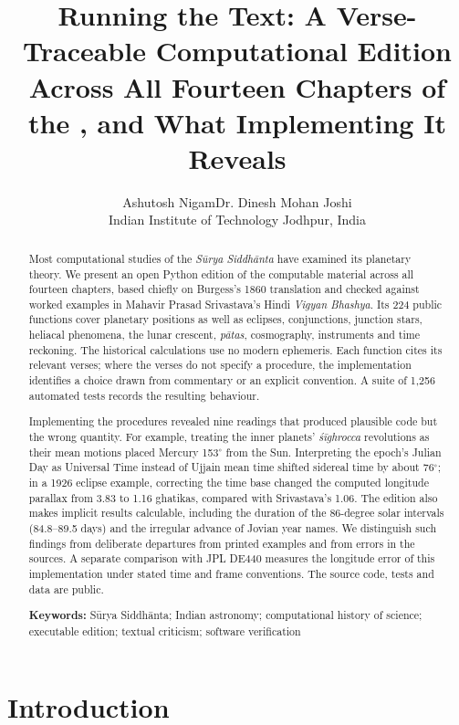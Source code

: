 \documentclass[11pt,a4paper]{article}
\title{Running the Text: A Verse-Traceable Computational Edition Across All Fourteen Chapters of the \SuSi{}, and What Implementing It Reveals}
\author{Ashutosh Nigam\quad Dr. Dinesh Mohan Joshi\\[6pt]
\small Indian Institute of Technology Jodhpur, India}
\date{}
\begin{document}
\maketitle

\begin{abstract}
Most computational studies of the \textit{S\={u}rya Siddh\={a}nta} have examined its planetary theory. We present an open Python edition of the computable material across all fourteen chapters, based chiefly on Burgess's 1860 translation and checked against worked examples in Mahavir Prasad Srivastava's Hindi \textit{Vigyan Bhashya}. Its 224 public functions cover planetary positions as well as eclipses, conjunctions, junction stars, heliacal phenomena, the lunar crescent, \textit{p\={a}tas}, cosmography, instruments and time reckoning. The historical calculations use no modern ephemeris. Each function cites its relevant verses; where the verses do not specify a procedure, the implementation identifies a choice drawn from commentary or an explicit convention. A suite of 1,256 automated tests records the resulting behaviour.

Implementing the procedures revealed nine readings that produced plausible code but the wrong quantity. For example, treating the inner planets' \textit{\'{s}\={i}ghrocca} revolutions as their mean motions placed Mercury 153$^\circ$ from the Sun. Interpreting the epoch's Julian Day as Universal Time instead of Ujjain mean time shifted sidereal time by about 76$^\circ$; in a 1926 eclipse example, correcting the time base changed the computed longitude parallax from 3.83 to 1.16 ghatikas, compared with Srivastava's 1.06. The edition also makes implicit results calculable, including the duration of the 86-degree solar intervals (84.8--89.5 days) and the irregular advance of Jovian year names. We distinguish such findings from deliberate departures from printed examples and from errors in the sources. A separate comparison with JPL DE440 measures the longitude error of this implementation under stated time and frame conventions. The source code, tests and data are public.

\noindent\textbf{Keywords:} S\={u}rya Siddh\={a}nta; Indian astronomy; computational history of science; executable edition; textual criticism; software verification

\end{abstract}

\section{Introduction}
\label{sec:intro}
\end{document}
